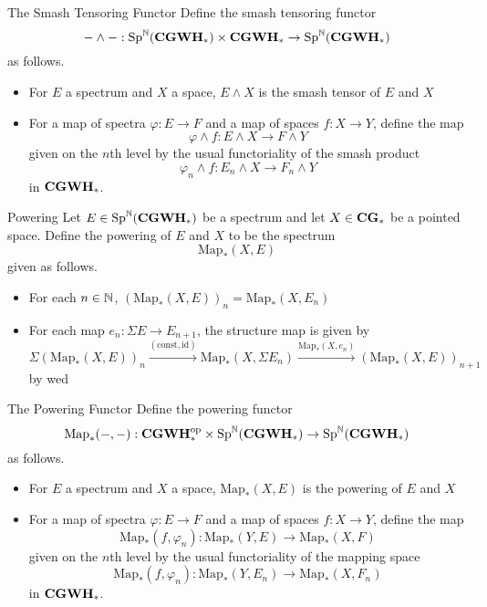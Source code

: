 \documentclass[a4paper]{article}
\begin{document}
\begin{defn}{The Smash Tensoring Functor}{} Define the smash tensoring functor $$-\wedge-:\text{Sp}^{\mathbb{N}}(\bold{CGWH}_\ast)\times\bold{CGWH}_\ast\to\text{Sp}^{\mathbb{N}}(\bold{CGWH}_\ast)$$ as follows. 
\begin{itemize}
\item For $E$ a spectrum and $X$ a space, $E\wedge X$ is the smash tensor of $E$ and $X$
\item For a map of spectra $\varphi:E\to F$ and a map of spaces $f:X\to Y$, define the map $$\varphi\wedge f:E\wedge X\to F\wedge Y$$ given on the $n$th level by the usual functoriality of the smash product $$\varphi_n\wedge f:E_n\wedge X\to F_n\wedge Y$$ in $\bold{CGWH}_\ast$. 
\end{itemize}
\end{defn}

\begin{defn}{Powering}{} Let $E\in\text{Sp}^{\mathbb{N}}(\bold{CGWH}_\ast)$ be a spectrum and let $X\in\bold{CG}_\ast$ be a pointed space. Define the powering of $E$ and $X$ to be the spectrum $$\text{Map}_\ast(X,E)$$ given as follows. 
\begin{itemize}
\item For each $n\in\mathbb{N}$, $(\text{Map}_\ast(X,E))_n=\text{Map}_\ast(X,E_n)$
\item For each map $e_n:\Sigma E\to E_{n+1}$, the structure map is given by $$\Sigma(\text{Map}_\ast(X,E))_n\overset{(\text{const},\text{id})}{\longrightarrow}\text{Map}_\ast(X,\Sigma E_n)\overset{\text{Map}_\ast(X,e_n)}{\longrightarrow}(\text{Map}_\ast(X,E))_{n+1}$$ by wed
\end{itemize}
\end{defn}

\begin{defn}{The Powering Functor}{} Define the powering functor $$\text{Map}_\ast(-,-):\bold{CGWH}_\ast^\text{op}\times\text{Sp}^{\mathbb{N}}(\bold{CGWH}_\ast)\to\text{Sp}^{\mathbb{N}}(\bold{CGWH}_\ast)$$ as follows. 
\begin{itemize}
\item For $E$ a spectrum and $X$ a space, $\text{Map}_\ast(X,E)$ is the powering of $E$ and $X$
\item For a map of spectra $\varphi:E\to F$ and a map of spaces $f:X\to Y$, define the map $$\text{Map}_\ast(f,\varphi_n):\text{Map}_\ast(Y,E)\to\text{Map}_\ast(X,F)$$ given on the $n$th level by the usual functoriality of the mapping space $$\text{Map}_\ast(f,\varphi_n):\text{Map}_\ast(Y,E_n)\to\text{Map}_\ast(X,F_n)$$ in $\bold{CGWH}_\ast$. 
\end{itemize}
\end{defn}
\end{document}

